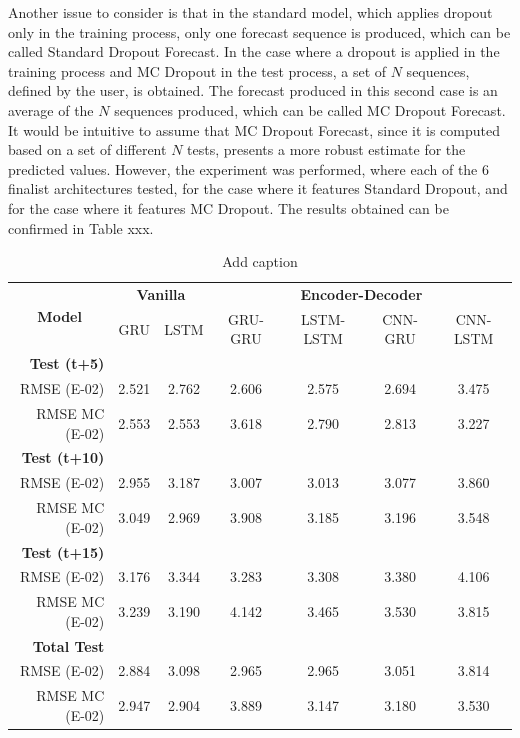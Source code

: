 Another issue to consider is that in the standard model, which applies dropout only in the training process, only one forecast sequence is produced, which can be called Standard Dropout Forecast. In the case where a dropout is applied in the training process and MC Dropout in the test process, a set of $N$ sequences, defined by the user, is obtained. The forecast produced in this second case is an average of the $N$ sequences produced, which can be called MC Dropout Forecast. It would be intuitive to assume that MC Dropout Forecast, since it is computed based on a set of different $N$ tests, presents a more robust estimate for the predicted values. However, the experiment was performed, where each of the 6 finalist architectures tested, for the case where it features Standard Dropout, and for the case where it features MC Dropout. The results obtained can be confirmed in Table xxx. 

\begin{table}[htbp]
  \centering
  \caption{Add caption}
    \begin{tabular}{r|cc|cccc}
    \multicolumn{1}{c|}{\multirow{2}[1]{*}{\textbf{Model}}} & \multicolumn{2}{c|}{\textbf{Vanilla}} & \multicolumn{4}{c}{\textbf{Encoder-Decoder}} \\
      & GRU & LSTM & GRU-GRU & LSTM-LSTM & CNN-GRU & CNN-LSTM \\
    \midrule
    \textbf{Test (t+5)} &   &   &   &   &   &  \\
    RMSE (E-02) & 2.521 & 2.762 & 2.606 & 2.575 & 2.694 & 3.475 \\
    RMSE MC (E-02) & 2.553 & 2.553 & 3.618 & 2.790 & 2.813 & 3.227 \\
    \textbf{Test (t+10)} &   &   &   &   &   &  \\
    RMSE (E-02) & 2.955 & 3.187 & 3.007 & 3.013 & 3.077 & 3.860 \\
    RMSE MC (E-02) & 3.049 & 2.969 & 3.908 & 3.185 & 3.196 & 3.548 \\
    \textbf{Test (t+15)} &   &   &   &   &   &  \\
    RMSE (E-02) & 3.176 & 3.344 & 3.283 & 3.308 & 3.380 & 4.106 \\
    RMSE MC (E-02) & 3.239 & 3.190 & 4.142 & 3.465 & 3.530 & 3.815 \\
    \midrule
    \textbf{Total Test} &   &   &   &   &   &  \\
    RMSE (E-02) & 2.884 & 3.098 & 2.965 & 2.965 & 3.051 & 3.814 \\
    RMSE MC (E-02) & 2.947 & 2.904 & 3.889 & 3.147 & 3.180 & 3.530 \\
    \end{tabular}%
  \label{tab:addlabel}%
\end{table}%





